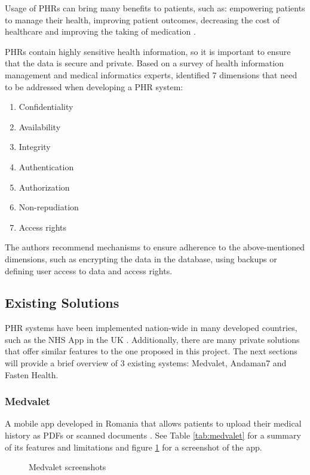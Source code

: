 Usage of PHRs can bring many benefits to patients, such as: empowering patients to manage their health, improving patient outcomes, decreasing the cost of healthcare and improving the taking of medication \parencite{phrsecurity}.

PHRs contain highly sensitive health information, so it is important to ensure that the data is secure and private. Based on a survey of health information management and medical informatics experts, \textcite{phrsecurity} identified 7 dimensions that need to be addressed when developing a PHR system:
\begin{enumerate}
    \item Confidentiality
    \item Availability
    \item Integrity
    \item Authentication
    \item Authorization
    \item Non-repudiation
    \item Access rights
\end{enumerate}

The authors recommend mechanisms to ensure adherence to the above-mentioned dimensions, such as encrypting the data in the database, using backups or defining user access to data and access rights.

\subsection{Existing Solutions}

PHR systems have been implemented nation-wide in many developed countries, such as the NHS App in the UK \parencite{phrlist}. Additionally, there are many private solutions that offer similar features to the one proposed in this project. The next sections will provide a brief overview of 3 existing systems: Medvalet, Andaman7 and Fasten Health.

\subsubsection{Medvalet}

A mobile app developed in Romania that allows patients to upload their medical history as PDFs or scanned documents \parencite{medvalet}. See Table \ref{tab:medvalet} for a summary of its features and limitations and figure \ref{fig:medvalet} for a screenshot of the app.

\begin{figure}[h!]
    \centering
     \quad
    \caption{Medvalet screenshots}\label{fig:medvalet}
\end{figure}

